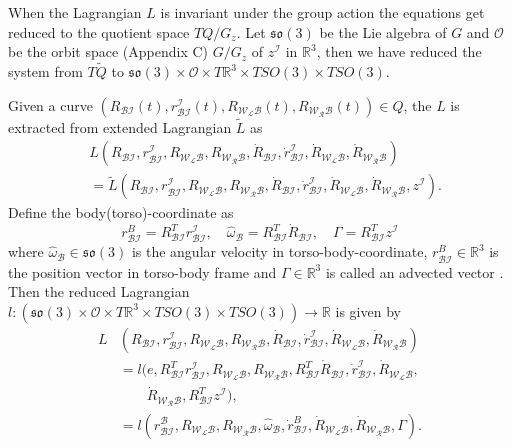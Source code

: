 \documentclass[letterpaper, 10 pt, conference]{ieeeconf}  \newcommand{\RN}[1]{\textup{\uppercase\expandafter{\romannumeral#1}}}
\begin{document}
When the Lagrangian $L$ is invariant under the group action the equations get reduced to the quotient space $TQ/G_{z}$. Let $\mathfrak{so}(3)$ be the Lie algebra of $G$ and $\mathcal{O}$ be the orbit space (Appendix C) $G/G_{z}$ of $z^{\mathcal{I}}$ in $\mathbb{R}^{3}$, then we have reduced the system from $T\tilde{Q}$ to $\mathfrak{so}(3) \times \mathcal{O} \times T\mathbb{R}^{3} \times TSO(3) \times TSO(3)$. 

Given a curve $(R_{\mathcal{BI}}(t), r_{\mathcal{BI}}^{\mathcal{I}}(t), R_{\mathcal{W_LB}}(t), R_{\mathcal{W_RB}}(t)) \in Q$, the $L$ is extracted from extended Lagrangian $\tilde{L}$ as
\begin{align*}\nonumber
&L( R_{\mathcal{BI}}, r_{\mathcal{BI}}^{\mathcal{I}}, R_{\mathcal{W_LB}}, R_{\mathcal{W_RB}},\dot{R}_{\mathcal{BI}},\dot{r}_{\mathcal{BI}}^{\mathcal{I}},\dot{R}_{\mathcal{W_LB}},\dot{R}_{\mathcal{W_RB}})\\
& = \tilde{L}(R_{\mathcal{BI}}, r_{\mathcal{BI}}^{\mathcal{I}}, R_{\mathcal{W_LB}}, R_{\mathcal{W_RB}},\dot{R}_{\mathcal{BI}},\dot{r}_{\mathcal{BI}}^{\mathcal{I}},\dot{R}_{\mathcal{W_LB}},\dot{R}_{\mathcal{W_RB}},z^{\mathcal{I}}).
\end{align*}
Define the body(torso)-coordinate as
\begin{equation}\label{body_coordinates}
r_{\mathcal{BI}}^{B}=R_{\mathcal{BI}}^{T}r^\mathcal{I}_{\mathcal{BI}}, \quad \widehat{\omega}_{\mathcal{B}}= R_{\mathcal{BI}}^{T}\dot{R}_{\mathcal{BI}}, \quad \Gamma = R_{\mathcal{BI}}^{T}z^{\mathcal{I}}
\end{equation}
where $\widehat{\omega}_{\mathcal{B}} \in \mathfrak{so}(3)$ is the angular velocity in torso-body-coordinate, $r_{\mathcal{BI}}^{B} \in \mathbb{R}^{3}$ is the position vector in torso-body frame and $\Gamma \in \mathbb{R}^{3}$ is called an advected vector \cite{cendra}. Then the reduced Lagrangian $l: (\mathfrak{so}(3) \times \mathcal{O} \times
T\mathbb{R}^{3} \times TSO(3) \times TSO(3)) \longrightarrow \mathbb{R}$ is given by
\begin{align*}
L&( R_{\mathcal{BI}}, r_{\mathcal{BI}}^{\mathcal{I}}, R_{\mathcal{W_LB}}, R_{\mathcal{W_RB}},\dot{R}_{\mathcal{BI}},\dot{r}_{\mathcal{BI}}^{\mathcal{I}},\dot{R}_{\mathcal{W_LB}},\dot{R}_{\mathcal{W_RB}})\\
&=l(e,R_{\mathcal{BI}}^{T}r_{\mathcal{BI}}^{\mathcal{I}}, R_{\mathcal{W_LB}}, R_{\mathcal{W_RB}},R_{\mathcal{BI}}^{T}\dot{R}_{\mathcal{BI}},\dot{r}_{\mathcal{BI}}^{\mathcal{I}},\dot{R}_{\mathcal{W_LB}},\\ & \qquad \dot{R}_{\mathcal{W_RB}},R_{\mathcal{BI}}^{T}z^{\mathcal{I}}),\\
& = l(r_{\mathcal{BI}}^{\mathcal{B}},R_{\mathcal{W_LB}}, R_{\mathcal{W_RB}},\widehat{\omega}_{\mathcal{B}},\dot{r}_{\mathcal{BI}}^{B},\dot{R}_{\mathcal{W_LB}},\dot{R}_{\mathcal{W_RB}},\Gamma).
\end{align*}
\end{document}
